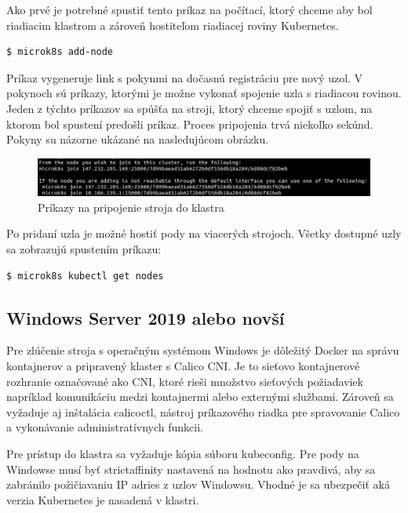 Ako prvé je potrebné spustiť tento príkaz na počítací, ktorý chceme aby bol riadiacim klastrom a zároveň hostiteľom riadiacej roviny Kubernetes.

\begin{lstlisting}[language=Bash]
    $ microk8s add-node
    \end{lstlisting}

Príkaz vygeneruje link s pokynmi na dočasnú registráciu pre nový uzol. V pokynoch sú príkazy, ktorými je možne vykonať spojenie uzla s riadiacou rovinou. Jeden z týchto príkazov sa spúšťa na stroji, ktorý chceme spojiť s uzlom, na ktorom bol spustení predošli príkaz. Proces pripojenia trvá niekoľko sekúnd. Pokyny su názorne ukázané na nasledujúcom obrázku.

\begin{figure}[h!]
    \includegraphics[width=\linewidth]{figures/addnode}
    \caption{ Príkazy na pripojenie stroja do klastra }
\end{figure}

Po pridaní uzla je možné hostiť pody na viacerých strojoch. Všetky dostupné uzly sa zobrazujú spustením príkazu:

\begin{lstlisting}[language=Bash]
    $ microk8s kubectl get nodes
    \end{lstlisting}

\subsection*{Windows Server 2019 alebo novší}

Pre zlúčenie stroja s operačným systémom Windows je dôležitý Docker na správu kontajnerov a pripravený klaster s Calico CNI. Je to sieťovo kontajnerové rozhranie označované ako CNI, ktoré rieši množstvo sieťových požiadaviek napríklad komunikáciu medzi kontajnermi alebo externými službami. Zároveň sa vyžaduje aj inštalácia calicoctl, nástroj príkazového riadka pre spravovanie Calico a vykonávanie administratívnych funkcii.

Pre prístup do klastra sa vyžaduje kópia súboru kubeconfig. Pre pody na Windowse musí byť strictaffinity nastavená na hodnotu ako pravdivá, aby sa zabránilo požičiavaniu IP adries z uzlov Windowsu. Vhodné je sa ubezpečiť aká verzia Kubernetes je nasadená v klastri.

